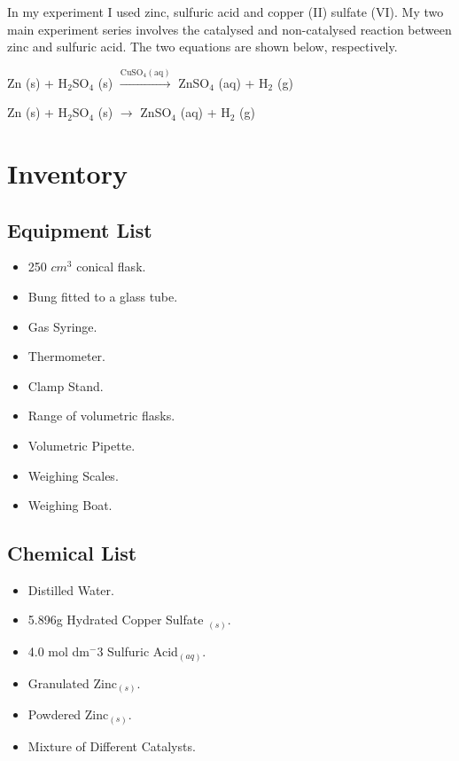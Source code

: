 In my experiment I used zinc, sulfuric acid and copper (II) sulfate (VI). My two main experiment series involves the catalysed and non-catalysed reaction between zinc and sulfuric acid. The two equations are shown below, respectively.

Zn (s) + H$_2$SO$_4$ (s) $\xrightarrow{\mathrm{CuSO_4 (aq)}}$ ZnSO$_4$ (aq) + H$_2$ (g)

Zn (s) + H$_2$SO$_4$ (s) $\rightarrow$ ZnSO$_4$ (aq) + H$_2$ (g)







































\section{Inventory}

	\subsection{Equipment List}
\begin{itemize}
\item 250 $cm^3$ conical flask.
\item Bung fitted to a glass tube.
\item Gas Syringe.
\item Thermometer.
\item Clamp Stand.
\item Range of volumetric flasks.
\item Volumetric Pipette.
\item Weighing Scales.
\item Weighing Boat.
\end{itemize}

	\subsection{Chemical List}
\begin{itemize}
\item Distilled Water.
\item 5.896g Hydrated Copper Sulfate $_{(s)}$.
\item 4.0 mol dm$^-3$ Sulfuric Acid$_{(aq)}$.
\item Granulated Zinc$_{(s)}$.
\item Powdered Zinc$_{(s)}$.
\item Mixture of Different Catalysts.
\end{itemize}






